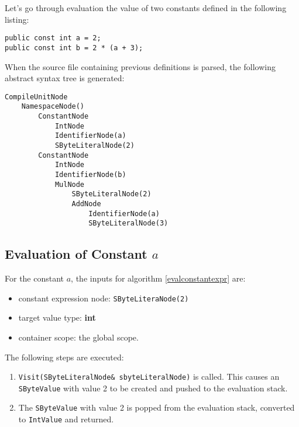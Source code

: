\documentclass[a4paper,oneside,11pt]{book}
\theoremstyle{definition}
\begin{document}
Let's go through evaluation the value of two constants defined in the following listing:

\lstset{language=Cmajor}
\begin{lstlisting}[frame=trBL]
public const int a = 2;
public const int b = 2 * (a + 3);
\end{lstlisting}

\begin{flushleft}
When the source file containing previous definitions is parsed, the following abstract syntax tree is generated:

\begin{verbatim}
CompileUnitNode
    NamespaceNode()
        ConstantNode
            IntNode
            IdentifierNode(a)
            SByteLiteralNode(2)
        ConstantNode
            IntNode
            IdentifierNode(b)
            MulNode
                SByteLiteralNode(2)
                AddNode
                    IdentifierNode(a)
                    SByteLiteralNode(3)
\end{verbatim}
\end{flushleft}

\subsection{Evaluation of Constant $a$}

For the constant $a$, the inputs for algorithm \ref{evalconstantexpr} are:
\begin{itemize}
\item
constant expression node: \verb|SByteLiteraNode(2)|
\item
target value type: \textbf{int}
\item
container scope: the global scope.
\end{itemize}
The following steps are executed:
\begin{enumerate}
\item
\verb|Visit(SByteLiteralNode& sbyteLiteralNode)| is called.
This causes an \verb|SByteValue| with value 2 to be created and pushed to the evaluation stack.
\item
The \verb|SByteValue| with value 2 is popped from the evaluation stack, converted to \verb|IntValue| and returned.
\end{enumerate}
\end{document}
